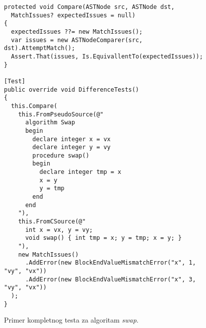 \begin{figure}[h!]
\centering
\begin{lstlisting}
protected void Compare(ASTNode src, ASTNode dst, 
  MatchIssues? expectedIssues = null) 
{
  expectedIssues ??= new MatchIssues();
  var issues = new ASTNodeComparer(src, dst).AttemptMatch();
  Assert.That(issues, Is.EquivallentTo(expectedIssues));
}

[Test]
public override void DifferenceTests()
{
  this.Compare(
    this.FromPseudoSource(@"
      algorithm Swap 
      begin
        declare integer x = vx
        declare integer y = vy
        procedure swap()
        begin
          declare integer tmp = x
          x = y  
          y = tmp
        end
      end
    "),
    this.FromCSource(@"
      int x = vx, y = vy;
      void swap() { int tmp = x; y = tmp; x = y; }
    "),
    new MatchIssues()
      .AddError(new BlockEndValueMismatchError("x", 1, "vy", "vx"))
      .AddError(new BlockEndValueMismatchError("x", 3, "vy", "vx"))
  );
}
\end{lstlisting}
\caption{Primer kompletnog testa za algoritam \emph{swap}.}
\label{fig:ImplTestsIntegration}
\end{figure}
